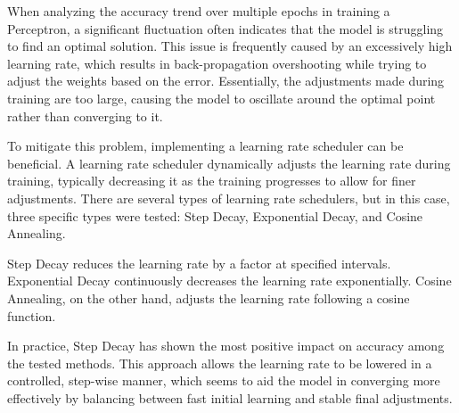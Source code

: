 \documentclass{article}
\begin{document}
\begin{multicols}{2}

When analyzing the accuracy trend over multiple epochs in training a Perceptron, a significant fluctuation often indicates that the model is struggling to find an optimal solution. This issue is frequently caused by an excessively high learning rate, which results in back-propagation overshooting while trying to adjust the weights based on the error. Essentially, the adjustments made during training are too large, causing the model to oscillate around the optimal point rather than converging to it.


To mitigate this problem, implementing a learning rate scheduler can be beneficial. A learning rate scheduler dynamically adjusts the learning rate during training, typically decreasing it as the training progresses to allow for finer adjustments. There are several types of learning rate schedulers, but in this case, three specific types were tested: Step Decay, Exponential Decay, and Cosine Annealing.

Step Decay reduces the learning rate by a factor at specified intervals. Exponential Decay continuously decreases the learning rate exponentially. Cosine Annealing, on the other hand, adjusts the learning rate following a cosine function.

In practice, Step Decay has shown the most positive impact on accuracy among the tested methods. This approach allows the learning rate to be lowered in a controlled, step-wise manner, which seems to aid the model in converging more effectively by balancing between fast initial learning and stable final adjustments.


\end{multicols}
\end{document}

